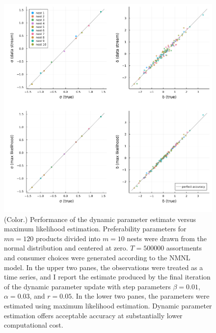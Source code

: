 \documentclass[preprint,12pt,authoryear]{elsarticle}
\begin{document}
\begin{figure}
\begin{center}\includegraphics[width=\linewidth, ]{../plots/param-est-dynamic-nested-as-static.png}\end{center}
\captionsetup{singlelinecheck=off}
    \caption[.]{(Color.) Performance of the dynamic parameter estimate versus maximum likelihood estimation. Preferability parameters for $mn = 120$ products divided into $m=10$ nests were drawn from the normal distribution and centered at zero. $T=500000$ assortments and consumer choices were generated according to the NMNL model. In the upper two panes, the observations were treated as a time series, and I report the estimate produced by the final iteration of the dynamic parameter update with step parameters $\beta = 0.01$, $\alpha = 0.03$, and $r = 0.05$. In the lower two panes, the parameters were estimated using maximum likelihood estimation. Dynamic parameter estimation offers acceptable accuracy at substantially lower computational cost.}
\label{param-est-dynamic-nested-as-static}
\end{figure}
\end{document}
